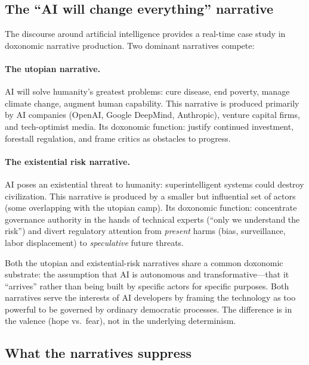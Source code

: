 \subsection{The ``AI will change everything'' narrative}

The discourse around artificial intelligence provides a real-time case study in doxonomic narrative production.
Two dominant narratives compete:

\paragraph{The utopian narrative.}
AI will solve humanity's greatest problems: cure disease, end poverty, manage climate change, augment human capability.
This narrative is produced primarily by AI companies (OpenAI, Google DeepMind, Anthropic), venture capital firms, and tech-optimist media.
Its doxonomic function: justify continued investment, forestall regulation, and frame critics as obstacles to progress.

\paragraph{The existential risk narrative.}
AI poses an existential threat to humanity: superintelligent systems could destroy civilization.
This narrative is produced by a smaller but influential set of actors (some overlapping with the utopian camp).
Its doxonomic function: concentrate governance authority in the hands of technical experts (``only we understand the risk'') and divert regulatory attention from \emph{present} harms (bias, surveillance, labor displacement) to \emph{speculative} future threats.

\begin{proposition}
\label{prop:ai-narratives}
Both the utopian and existential-risk narratives share a common doxonomic substrate: the assumption that AI is autonomous and transformative---that it ``arrives'' rather than being built by specific actors for specific purposes.
Both narratives serve the interests of AI developers by framing the technology as too powerful to be governed by ordinary democratic processes.
The difference is in the valence (hope vs.\ fear), not in the underlying determinism.
\end{proposition}

\subsection{What the narratives suppress}


